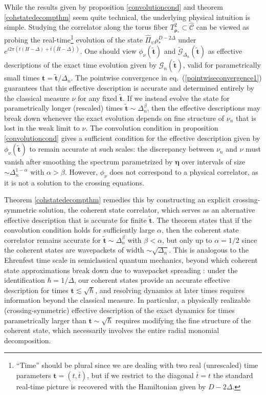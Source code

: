 \documentclass[a4paper,11pt]{article}
\theoremstyle{plain}
\theoremstyle{definition}
\theoremstyle{remark}
\newcommand{\bs}[1]{\boldsymbol{#1}}
\newcommand{\De}{\Delta}
\begin{document}
While the results given by proposition \ref{convolutioncond} and theorem \ref{cohstatedecompthm} seem quite technical, the underlying physical intuition is simple. Studying the correlator along the torus fiber $T^2_{\bs{\rho}_*} \subset \widehat{\mathscr{C}}$ can be viewed as probing the real-time\footnote{``Time'' should be plural since we are dealing with two real (unrescaled) time parameters $\bs{t} = (t,\bar{t})$, but if we restrict to the diagonal $\bar{t} =t$ the standard real-time picture is recovered with the Hamiltonian given by $D - 2\De$.} evolution of the state $\hat{\Pi}_{\psi}\rho_*^{D - 2\De}$ under $e^{i 2\pi \left( t(H-\De) + \bar{t}(\bar{H}-\De) \right)}$. One should view $\phi_{\nu}(\tilde{\bs{t}})$ and $\tilde{\mathcal{G}}_{\De_n}(\tilde{\bs{t}})$ as effective descriptions of the exact time evolution given by $\mathcal{G}_n(\tilde{\bs{t}})$, valid for parametrically small times $\bs{t} = \tilde{\bs{t}}/\De_n$. The pointwise convergence in eq.~(\ref{pointwiseconvergence1}) guarantees that this effective description is accurate and determined entirely by the classical measure $\nu$ for any fixed $\tilde{\bs{t}}$. If we instead evolve the state for parametrically longer (rescaled) times $\tilde{\bs{t}} \sim \De_n^{\beta}$, then the effective descriptions may break down whenever the exact evolution depends on fine structure of $\nu_n$ that is lost in the weak limit to $\nu$. The convolution condition in proposition \ref{convolutioncond} gives a sufficient condition for the effective description given by $\phi_{\nu}(\tilde{\bs{t}})$ to remain accurate at such scales: the discrepancy between $\nu_n$ and $\nu$ must vanish after smoothing the spectrum parametrized by $\bs{\eta}$ over intervals of size $\sim\De_n^{1-\alpha}$ with $\alpha > \beta$. However, $\phi_\nu$ does not correspond to a physical correlator, as it is not a solution to the crossing equations. 

Theorem \ref{cohstatedecompthm} remedies this by constructing an explicit crossing-symmetric solution, the coherent state correlator, which serves as an alternative effective description that is accurate for finite $\tilde{\bs{t}}$. The theorem states that if the convolution condition holds for sufficiently large $\alpha$, then the coherent state correlator remains accurate for $\tilde{\bs{t}} \sim \De_n^{\beta}$ with $\beta < \alpha$, but only up to $\alpha = 1/2$ since the coherent states are wavepackets of width $\sim \sqrt{\De_n}$. This is analogous to the Ehrenfest time scale in semiclassical quantum mechanics, beyond which coherent state approximations break down due to wavepacket spreading \cite{Bambusi1999}: under the identification $\hbar = 1/\De$, our coherent states provide an accurate effective description for times $\bs{t} \lesssim \sqrt{\hbar}$, and resolving dynamics at later times requires information beyond the classical measure. In particular, a physically realizable (crossing-symmetric) effective description of the exact dynamics for times parametrically larger than $\bs{t} \sim \sqrt{\hbar}$ requires modifying the fine structure of the coherent state, which necessarily involves the entire radial monomial decomposition.
\end{document}
